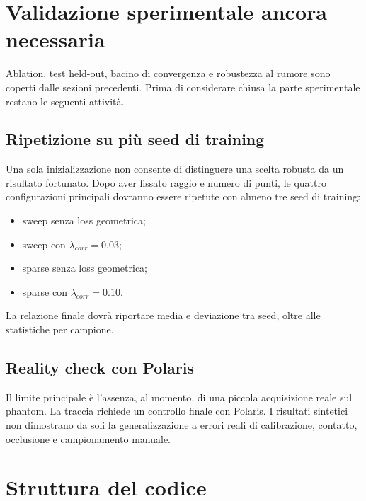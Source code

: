 \documentclass[11pt,a4paper]{article}
\begin{document}
\section{Validazione sperimentale ancora necessaria}

Ablation, test held-out, bacino di convergenza e robustezza al rumore sono
coperti dalle sezioni precedenti. Prima di considerare chiusa la parte
sperimentale restano le seguenti attività.

\subsection{Ripetizione su più seed di training}

Una sola inizializzazione non consente di distinguere una scelta robusta da un
risultato fortunato. Dopo aver fissato raggio e numero di punti, le quattro
configurazioni principali dovranno essere ripetute con almeno tre seed di
training:

\begin{itemize}
    \item sweep senza loss geometrica;
    \item sweep con $\lambda_{corr}=0.03$;
    \item sparse senza loss geometrica;
    \item sparse con $\lambda_{corr}=0.10$.
\end{itemize}

La relazione finale dovrà riportare media e deviazione tra seed, oltre alle
statistiche per campione.

\subsection{Reality check con Polaris}

Il limite principale è l'assenza, al momento, di una piccola acquisizione
reale sul phantom. La traccia richiede un controllo finale con Polaris. I
risultati sintetici non dimostrano da soli la generalizzazione a errori reali
di calibrazione, contatto, occlusione e campionamento manuale.

\section{Struttura del codice}
\end{document}
